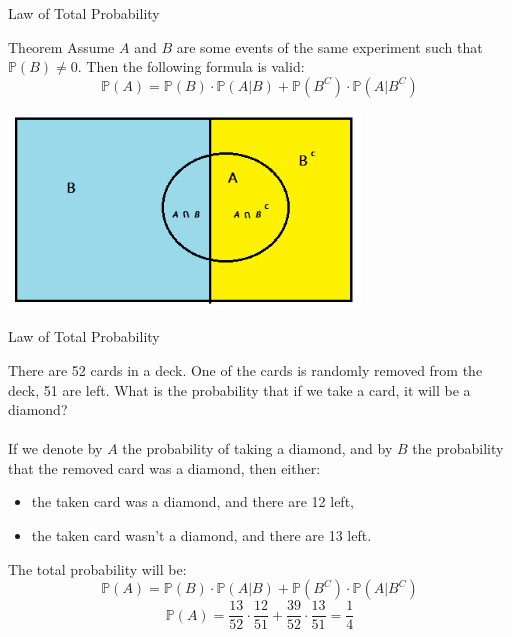 \documentclass{beamer}
\newcommand{\PP}{\mathbb{P}}
\begin{document}
\begin{frame}{Law of Total Probability}
\begin{block}{Theorem}
    Assume \( A \) and \( B \) are some events of the same experiment such that \( \mathbb{P}(B) \ne 0 \). Then the following formula is valid:
\[ \mathbb{P}(A) = \mathbb{P}(B) \cdot \mathbb{P}(A|B) + \mathbb{P}(B^C) \cdot \mathbb{P}(A|B^C) \]

\end{block}
      \begin{center}

    \includegraphics[width=0.7\textwidth, height=\textheight, keepaspectratio]{tp.png}
  \end{center}
    
\end{frame}



\begin{frame}{Law of Total Probability}
\begin{example}
    There are 52 cards in a deck. One of the cards is randomly removed from the deck, 51 are left. What is the probability that if we take a card, it will be a diamond?\pause
\\~\\
    If we denote by $A$ the probability of taking a diamond, and by $B$ the probability that the removed card was a diamond, then either:\pause
    \begin{itemize}
        \item the taken card was a diamond, and there are 12 left,
        \item the taken card wasn't a diamond, and there are 13 left.
    \end{itemize}
    \pause The total probability will be:
    \[ \PP(A)=\PP(B)\cdot \PP(A|B)+\PP(B^C)\cdot \PP(A|B^C) \]
    \[ \PP(A)=\frac{13}{52}\cdot \frac{12}{51}+\frac{39}{52}\cdot \frac{13}{51} =\frac{1}{4}\]
\end{example}
\end{frame}
\end{document}
